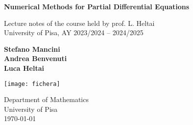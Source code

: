 \begin{titlepage}
    \centering
    \vspace*{2cm}
    
    \Huge
    \textbf{Numerical Methods for Partial Differential Equations}
    
    \vspace{1.5cm}
    
    \LARGE
    Lecture notes of the course held by prof. L. Heltai\\
    University of Pisa, AY 2023/2024 -- 2024/2025
    
    \vspace{2cm}
    
    \textbf{Stefano Mancini\\
    Andrea Benvenuti\\
    Luca Heltai}
    
    \vfill
    
    \texttt{[image: fichera]} %
    
    \vfill
    
    \Large
    Department of Mathematics\\
    University of Pisa\\
    \today
    
\end{titlepage}
